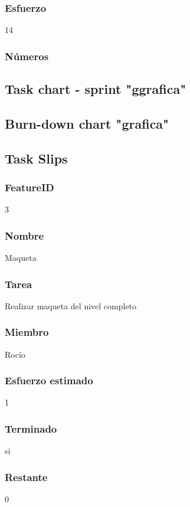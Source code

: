 \subsubsection{Esfuerzo}
14
\subsubsection{Números}



\subsection{Task chart - sprint "ggrafica"}



\subsection{Burn-down chart "grafica"}


\subsection{Task Slips}


\subsubsection{FeatureID}3
\subsubsection{Nombre}Maqueta
\subsubsection{Tarea}Realizar maqueta del nivel completo
\subsubsection{Miembro}Rocío
\subsubsection{Esfuerzo estimado}1
\subsubsection{Terminado}si
\subsubsection{Restante}0


